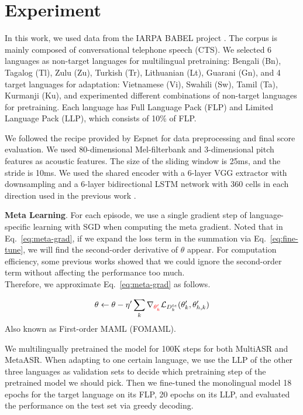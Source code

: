 \section{Experiment}
\label{sec:exp}


%
\label{ssec:exp-setup}
In this work, we used data from the IARPA BABEL project \cite{gales2014speech}. 
The corpus is mainly composed of conversational telephone speech (CTS). We selected 6 languages as non-target languages for multilingual pretraining: 
Bengali (Bn), Tagalog (Tl), Zulu (Zu), Turkish (Tr), Lithuanian (Lt), Guarani (Gn), and 4 target languages for adaptation: Vietnamese (Vi), Swahili (Sw), Tamil (Ta), Kurmanji (Ku), and experimented different combinations of non-target languages for pretraining.
Each language has Full Language Pack (FLP) and Limited Language Pack (LLP), which consists of 10\% of FLP.

We followed the recipe provided by Espnet \cite{watanabe2018espnet} for data preprocessing and final score evaluation.  We used 80-dimensional Mel-filterbank and 3-dimensional pitch features as acoustic features. The size of the sliding window is 25ms, and the stride is 10ms. We used the shared encoder with a 6-layer VGG extractor with downsampling and a 6-layer bidirectional LSTM network with 360 cells in each direction used in the previous work \cite{dalmia2018sequence}.



\textbf{Meta Learning}. For each episode, we use a single gradient step of language-specific learning with SGD when computing the meta gradient. Noted that in Eq.~\ref{eq:meta-grad}, if we expand the loss term in the summation via Eq.~\ref{eq:fine-tune}, we will find the second-order derivative of $\theta$ appear. For computation efficiency, some previous works \cite{finn2017model, nichol2018reptile} showed that we could ignore the second-order term without affecting the performance too much.\\
Therefore, we approximate Eq.~\ref{eq:meta-grad} as follows.

\begin{equation}
  \theta \leftarrow \theta - \eta^\prime \sum_k \nabla_{\textcolor{red}{\theta_k^\prime}} \mathcal{L}_{D^{te}_k}(\theta^\prime_k, \theta^\prime_{h,k})
\end{equation}
Also known as First-order MAML (FOMAML).

We multilingually pretrained the model for 100K steps for both MultiASR and MetaASR. When adapting to one certain language, we use the LLP of the other three languages as validation sets to decide which pretraining step of the pretrained model we should pick. Then we fine-tuned the monolingual model 18 epochs for the target language on its FLP, 20 epochs on its LLP, and evaluated the performance on the test set via greedy decoding.

